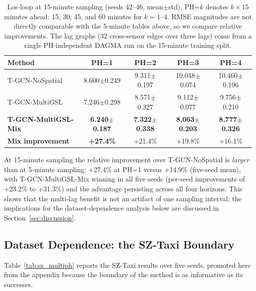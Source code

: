 \begin{table}[t]
\centering
\caption{Los-loop at 15-minute sampling (seeds 42--46, mean$\pm$std). PH=$k$ denotes $k\times15$ minutes ahead: 15, 30, 45, and 60 minutes for $k=1$--4. RMSE magnitudes are not directly comparable with the 5-minute tables above, so we compare relative improvements. The lag graphs (32 cross-sensor edges over three lags) come from a single PH-independent DAGMA run on the 15-minute training split.}
\label{tab:los15min}
\small
\setlength{\tabcolsep}{4pt}
\begin{tabular}{lcccc}
\toprule
\textbf{Method} & \textbf{PH=1} & \textbf{PH=2} & \textbf{PH=3} & \textbf{PH=4} \\
\midrule
T-GCN-NoSpatial & 8.600$\pm$0.249 & 9.311$\pm$0.197 & 10.048$\pm$0.074 & 10.460$\pm$0.196 \\
T-GCN-MultiGSL & 7.246$\pm$0.298 & 8.571$\pm$0.327 & 9.112$\pm$0.077 & 9.756$\pm$0.210 \\
\textbf{T-GCN-MultiGSL-Mix} & \textbf{6.240$\pm$0.187} & \textbf{7.322$\pm$0.338} & \textbf{8.063$\pm$0.203} & \textbf{8.777$\pm$0.326} \\
\midrule
\textbf{Mix improvement} & \textbf{+27.4\%} & +21.4\% & +19.8\% & +16.1\% \\
\bottomrule
\end{tabular}
\end{table}

At 15-minute sampling the relative improvement over T-GCN-NoSpatial is \emph{larger} than at 5-minute sampling: +27.4\% at PH=1 versus +14.9\% (five-seed mean), with T-GCN-MultiGSL-Mix winning in all five seeds (per-seed improvements of +23.2\% to +31.3\%) and the advantage persisting across all four horizons. This shows that the multi-lag benefit is not an artifact of one sampling interval; the implications for the dataset-dependence analysis below are discussed in Section~\ref{sec:discussion}.

\subsection{Dataset Dependence: the SZ-Taxi Boundary}\label{sec:sz_boundary}

Table~\ref{tab:sz_multiph} reports the SZ-Taxi results over five seeds, promoted here from the appendix because the boundary of the method is as informative as its successes.

